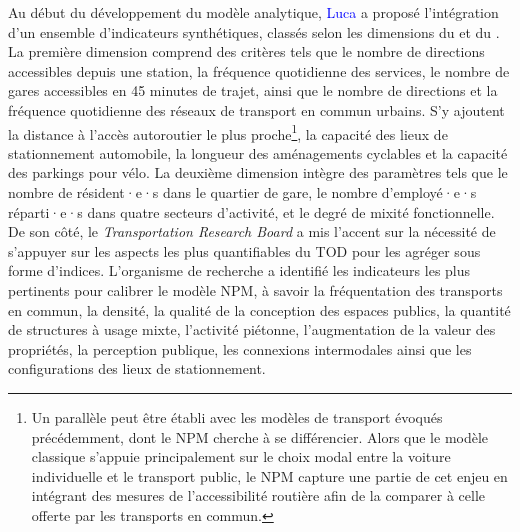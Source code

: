 \begin{refsegment}
Au début du développement du modèle analytique, \textcolor{blue}{Luca} \textcolor{blue}{\textcite[202-203]{bertolini_spatial_1999}} a proposé l'intégration d'un ensemble d'indicateurs synthétiques, classés selon les dimensions du  et du . La première dimension comprend des critères tels que le nombre de directions accessibles depuis une station, la fréquence quotidienne des services, le nombre de gares accessibles en 45 minutes de trajet, ainsi que le nombre de directions et la fréquence quotidienne des réseaux de transport en commun urbains. S'y ajoutent la distance à l'accès autoroutier le plus proche\footnote{
    Un parallèle peut être établi avec les modèles de transport évoqués précédemment, dont le \acrshort{NPM} cherche à se différencier. Alors que le modèle classique s’appuie principalement sur le choix modal entre la voiture individuelle et le transport public, le \acrshort{NPM} capture une partie de cet enjeu en intégrant des mesures de l’accessibilité routière afin de la comparer à celle offerte par les transports en commun.
}, la capacité des lieux de stationnement automobile, la longueur des aménagements cyclables et la capacité des parkings pour vélo. La deuxième dimension intègre des paramètres tels que le nombre de résident·e·s dans le quartier de gare, le nombre d'employé·e·s réparti·e·s dans quatre secteurs d'activité, et le degré de mixité fonctionnelle. De son côté, le \textsl{Transportation Research Board} a mis l'accent sur la nécessité de s'appuyer sur les aspects les plus quantifiables du \acrshort{TOD} pour les agréger sous forme d'indices. L'organisme de recherche \textcolor{blue}{\textcite{transportation_research_board_of_the_national_academies_transit_2007}} a identifié les indicateurs les plus pertinents pour calibrer le modèle \acrshort{NPM}, à savoir la fréquentation des transports en commun, la densité, la qualité de la conception des espaces publics, la quantité de structures à usage mixte, l'activité piétonne, l'augmentation de la valeur des propriétés, la perception publique, les connexions intermodales ainsi que les configurations des lieux de stationnement.%


\end{refsegment}
